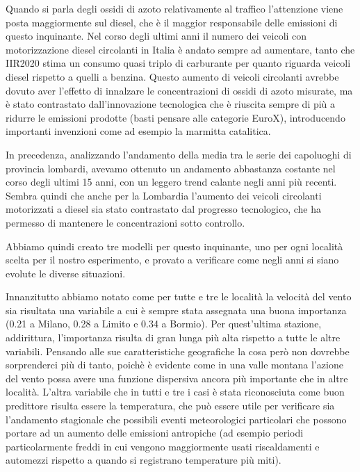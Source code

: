 \documentclass[a4paper,12pt]{report}
\begin{document}
Quando si parla degli ossidi di azoto relativamente al traffico l'attenzione viene posta maggiormente sul diesel, che è il maggior responsabile delle emissioni di questo inquinante. Nel corso degli ultimi anni il numero dei veicoli con motorizzazione diesel circolanti in Italia è andato sempre ad aumentare, tanto che IIR2020 \cite{iir2020} stima un consumo quasi triplo di carburante per quanto riguarda veicoli diesel rispetto a quelli a benzina. Questo aumento di veicoli circolanti avrebbe dovuto aver l'effetto di innalzare le concentrazioni di ossidi di azoto misurate, ma è stato contrastato dall'innovazione tecnologica che è riuscita sempre di più a ridurre le emissioni prodotte (basti pensare alle categorie EuroX), introducendo importanti invenzioni come ad esempio la marmitta catalitica.

In precedenza, analizzando  l'andamento della media tra le serie dei capoluoghi di provincia lombardi, avevamo ottenuto un andamento abbastanza costante nel corso degli ultimi 15 anni, con un leggero trend calante negli anni più recenti. Sembra quindi che anche per la Lombardia l'aumento dei veicoli circolanti motorizzati a diesel sia stato contrastato dal progresso tecnologico, che ha permesso di mantenere le concentrazioni sotto controllo.

Abbiamo quindi creato tre modelli per questo inquinante, uno per ogni località scelta per il nostro esperimento, e provato a verificare come negli anni si siano evolute le diverse situazioni.

Innanzitutto abbiamo notato come per tutte e tre le località la velocità del vento sia risultata una variabile a cui è sempre stata assegnata una buona importanza (0.21 a Milano, 0.28 a Limito e 0.34 a Bormio). Per quest'ultima stazione, addirittura, l'importanza risulta di gran lunga più alta rispetto a tutte le altre variabili.  Pensando alle sue caratteristiche geografiche la cosa però non dovrebbe sorprenderci più di tanto, poichè è evidente come in una valle montana l'azione del vento possa avere una funzione dispersiva ancora più importante che in altre località.
L'altra variabile che in tutti e tre i casi è stata riconosciuta come buon predittore risulta essere la temperatura, che può essere utile per verificare sia l'andamento stagionale che possibili eventi meteorologici particolari che possono portare ad un aumento delle emissioni antropiche (ad esempio periodi particolarmente freddi in cui vengono maggiormente usati riscaldamenti e automezzi rispetto a quando si registrano temperature più miti).  
\end{document}
